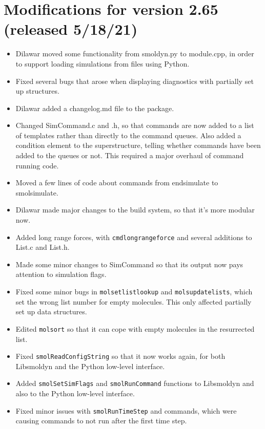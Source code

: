 \documentclass {scrbook}
\newcommand {\ttt} {\texttt}
\begin{document}
\section{Modifications for version 2.65 (released 5/18/21)}
\begin{itemize}
\item Dilawar moved some functionality from smoldyn.py to module.cpp, in order to support loading simulations from files using Python.
\item Fixed several bugs that arose when displaying diagnostics with partially set up structures.
\item Dilawar added a changelog.md file to the package.
\item Changed SimCommand.c and .h, so that commands are now added to a list of templates rather than directly to the command queues. Also added a condition element to the superstructure, telling whether commands have been added to the queues or not. This required a major overhaul of command running code.
\item Moved a few lines of code about commands from endsimulate to smolsimulate.
\item Dilawar made major changes to the build system, so that it's more modular now.
\item Added long range forces, with \ttt{cmdlongrangeforce} and several additions to List.c and List.h.
\item Made some minor changes to SimCommand so that its output now pays attention to simulation flags.
\item Fixed some minor bugs in \ttt{molsetlistlookup} and \ttt{molsupdatelists}, which set the wrong list number for empty molecules. This only affected partially set up data structures.
\item Edited \ttt{molsort} so that it can cope with empty molecules in the resurrected list.
\item Fixed \ttt{smolReadConfigString} so that it now works again, for both Libsmoldyn and the Python low-level interface.
\item Added \ttt{smolSetSimFlags} and \ttt{smolRunCommand} functions to Libsmoldyn and also to the Python low-level interface.
\item Fixed minor issues with \ttt{smolRunTimeStep} and commands, which were causing commands to not run after the first time step.
\end{itemize}
\end{document}
